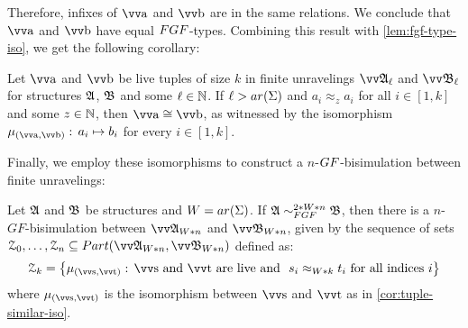 Therefore, infixes of $\elemtuptuplea$ and $\elemtuptupleb$ are in the same relations.
We conclude that $\elemtuptuplea$ and $\elemtuptupleb$ have equal $\FGF$-types.
Combining this result with \cref{lem:fgf-type-iso}, we get the following corollary:
\begin{corollary}\label{cor:tuple-similar-iso}
  Let $\elemtuptuplea$ and $\elemtuptupleb$ be live tuples of size $k$ in finite unravelings $\unravel{A}_{\ell}$ and $\unravel{B}_{\ell}$ for structures ${\mathfrak{A}}$, ${\mathfrak{B}}$ and some $\ell \in {\mathbb{N}}$.
  If $\ell > \arity(\Sigma)$ and $a_{i} \approx_{z} a_{i}$ for all $i \in [1,k]$ and some $z \in {\mathbb{N}}$, then $\elemtuptuplea \isoeq \elemtuptupleb$, as witnessed by the isomorphism $\mu_{(\elemtuptuplea, \elemtuptupleb)}:\, a_{i} \mapsto b_{i}$ for every $i \in [1, k]$.
\end{corollary}
Finally, we employ these isomorphisms to construct a $n$-$\GF$-bisimulation between finite unravelings:
\begin{lemma}
  Let ${\mathfrak{A}}$ and ${\mathfrak{B}}$ be structures and $W = \arity(\Sigma)$.
  If $\str{A} \bisimto_{\FGF}^{2 * W * n} \str{B}$, then there is a $n$-$GF$-bisimulation between $\unravel{A}_{W * n}$ and $\unravel{B}_{W * n}$, given by the sequence of sets $\bisimZ_{0}, \ldots, \bisimZ_{n} \subseteq \PartIso{\unravel{A}_{W * n}}{\unravel{B}_{W * n}}$ defined as:
  \begin{equation*}
    \bisimZ_{k} = \left\{
      \mu_{(\elemtuptuples, \elemtuptuplet)}:\,
      \elemtuptuples\ \text{and}\ \elemtuptuplet\ \text{are live and}\ \
      s_{i} \approx_{W * k} t_{i}\ \text{for all indices $i$}
    \right\}
  \end{equation*}
  where $\mu_{(\elemtuptuples, \elemtuptuplet)}$ is the isomorphism between $\elemtuptuples$ and $\elemtuptuplet$ as in \cref{cor:tuple-similar-iso}.
\end{lemma}
